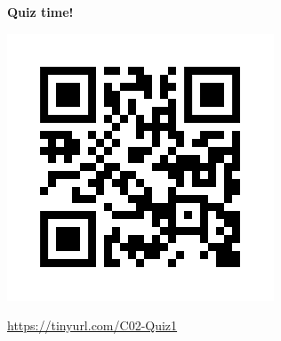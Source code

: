 \documentclass[xcolor=pdftex,romanian,colorlinks]{beamer}
\begin{document}
\begin{frame}
  \vfill
  \centering

\textbf{\large \alert{Quiz time!}}

\includegraphics[scale=.35]{../Quiz/C02-Q1.png}

 \url{https://tinyurl.com/C02-Quiz1}
  \vfill
\end{frame}
\end{document}
